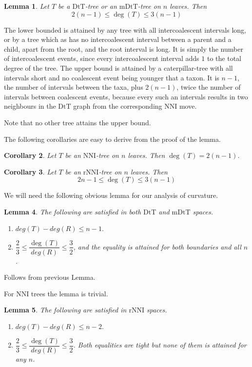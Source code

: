 \documentclass{amsart}
\newtheorem{lemma}{Lemma}
\newtheorem{corollary}[lemma]{Corollary}
\newcommand{\dts}{\mathrm{DtT}}
\newcommand{\nni}{\mathrm{NNI}}
\newcommand{\rnni}{\mathrm{rNNI}}
\newcommand{\mdts}{\mathrm{mDtT}}
\begin{document}
\begin{lemma}
Let $T$ be a $\dts$-tree or an $\mdts$-tree on $n$ leaves. Then \[2(n-1)\leq \deg(T)\leq3(n-1)\] 
\end{lemma}

\proof
The lower bounded is attained by any tree with all intercoalescent intervals 
long, or by a tree which as has no intercoalescent interval between a parent and
a child, apart from the root, and the root interval is long. It is simply the
number of intercoalescent events, since every intercoalescent interval adds $1$
to the total degree of the tree. The upper bound is attained by a 
caterpillar-tree with all intervals short and no coalescent event being younger
that a taxon. It is $n-1$, the number of intervals between the taxa, plus 
$2(n-1)$, twice the number of intervals between coalescent events, because 
every such an intervals results in two neighbours in the $\dts$ graph from
the corresponding NNI move. 

Note that no other tree attains the upper bound. 
\endproof

The following corollaries are easy to derive from the proof of the lemma. 

\begin{corollary}
Let $T$ be an $\nni$-tree on $n$ leaves. Then $\deg(T) = 2(n-1)$. 
\end{corollary}

\begin{corollary}
Let $T$ be an $\rnni$-tree on $n$ leaves. Then \[2n-1\leq \deg(T)\leq3(n-1)\] 
\end{corollary}

We will need the following obvious lemma for our analysis of curvature. 

\begin{lemma}\label{degreeBounds}
The following are satisfied in both $\dts$ and $\mdts$ spaces. 
\begin{enumerate}[(1)]
\item $deg(T)-deg(R) \leq n-1.$
\item $\dfrac23 \leq \dfrac{\deg(T)}{deg(R)} \leq \dfrac32$, and the equality is attained for both boundaries and all $n$. 
\end{enumerate}
\end{lemma}

\proof
Follows from previous Lemma. 
\endproof

For $\nni$ trees the lemma is trivial. 

\begin{lemma}
The following are satisfied in $\rnni$ spaces. 
\begin{enumerate}[(1)]
\item $deg(T)-deg(R) \leq n-2.$
\item $\dfrac23 \leq \dfrac{\deg(T)}{deg(R)} \leq \dfrac32$. 
Both equalities are tight but none of them is attained for any $n$. 
\end{enumerate}
\end{lemma}
\end{document}
